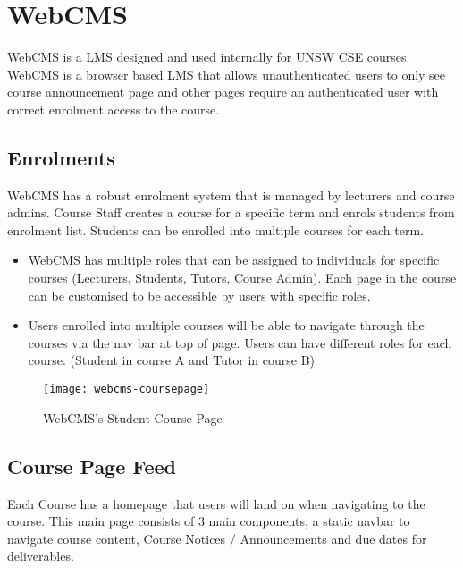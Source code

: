 \section{WebCMS}

WebCMS is a LMS designed and used internally for UNSW CSE courses. WebCMS is a browser based LMS that allows unauthenticated users to only see course announcement page and other pages require an authenticated user with correct enrolment access to the course.

\subsection{Enrolments}
WebCMS has a robust enrolment system that is managed by lecturers and course admins. Course Staff creates a course for a specific term and enrols students from enrolment list. Students can be enrolled into multiple courses for each term.

\begin{itemize}
	\item WebCMS has multiple roles that can be assigned to individuals for specific courses (Lecturers, Students, Tutors, Course Admin). Each page in the course can be customised to be accessible by users with specific roles.
	\item Users enrolled into multiple courses will be able to navigate through the courses via the nav bar at top of page. Users can have different roles for each course. (Student in course A and Tutor in course B)
\end{itemize}
\newpage

\begin{figure}[h!]
    \centering
    \texttt{[image: webcms-coursepage]}
    \caption{WebCMS's Student Course Page}
\end{figure}

\subsection{Course Page Feed}
Each Course has a homepage that users will land on when navigating to the course. This main page consists of 3 main components, a static navbar to navigate course content, Course Notices / Announcements and due dates for deliverables.

